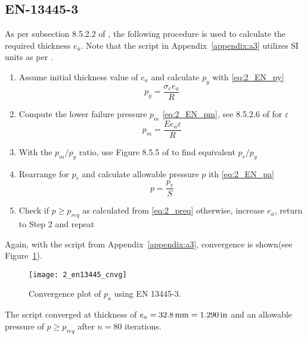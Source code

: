 \subsection{EN-13445-3}
\label{section:2_EN}
As per subsection 8.5.2.2 of \cite{EN134453}, the following procedure is used to calculate the required thickness $e_a$. Note that the script in Appendix~\ref{appendix:a3} utilizes SI units as per \cite{EN134453}.

\begin{enumerate}
	\item Assume initial thickness value of $e_a$ and calculate $p_y$ with \ref{eq:2_EN_py}
	      \begin{equation}
	      	\label{eq:2_EN_py}
	      	p_y = \frac{\sigma_e e_a}{R}
	      \end{equation}
	\item Compute the lower failure pressure $p_m$ \ref{eq:2_EN_pm}, see 8.5.2.6 of \cite{EN134453} for $\varepsilon$
	      \begin{equation}
	      	\label{eq:2_EN_pm}
	      	p_m = \frac{E e_a  \varepsilon}{R}
	      \end{equation}
	\item With the $p_m/p_y$ ratio, use Figure 8.5.5 of \cite{EN134453} to find equivalent $p_r/p_y$
	\item Rearrange for $p_r$ and calculate allowable pressure $p$ ith \ref{eq:2_EN_pa}
	      \begin{equation}
	      	\label{eq:2_EN_pa}
	      	p = \frac{p_r}{S}
	      \end{equation}
	\item Check if $p \geq p_{req}$ as calculated from \ref{eq:2_preq} otherwise, increase $e_a$, return to Step 2 and repeat\\
\end{enumerate}

Again, with the script from Appendix~\ref{appendix:a3}, convergence is shown(see Figure~\ref{fig:2_en13445_cnvg}).
\begin{figure}[H]
	\centering
	\texttt{[image: 2\_en13445\_cnvg]}
	\caption{Convergence plot of $p_a$ using EN 13445-3.}
	\label{fig:2_en13445_cnvg}
\end{figure}

The script converged at thickness of $e_a = 32.8\,\mathrm{mm} = 1.290\,\mathrm{in}$ and an allowable pressure of $p\geq p_{req}$ after $n=80$ iterations. 

